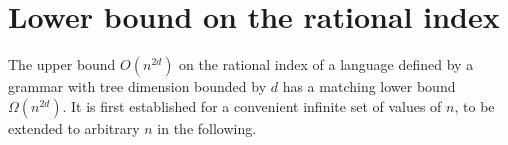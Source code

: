 \documentclass[runningheads]{llncs}
\begin{document}

\section{Lower bound on the rational index}\label{section_lower_bound} %

The upper bound $O(n^{2d})$ on the rational index of a language
defined by a grammar with tree dimension bounded by $d$
has a matching lower bound $\Omega(n^{2d})$.
It is first established for a convenient infinite set of values of $n$,
to be extended to arbitrary $n$ in the following.
\end{document}
